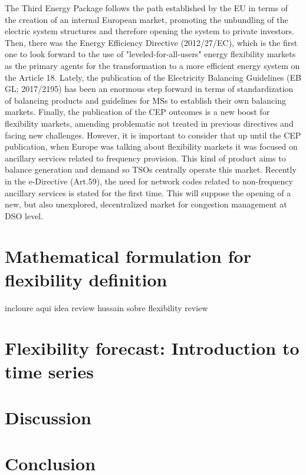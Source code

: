 The Third Energy Package follows the path established by the EU in terms of the creation of
an internal European market, promoting the unbundling of the electric system structures and therefore opening the system to private investors. Then, there was the Energy Efficiency Directive
(2012/27/EC), which is the first one to look forward to the use of "leveled-for-all-users"
energy flexibility markets as the primary agents for the transformation to a more efficient energy
system on the Article 18. Lately, the publication of the Electricity Balancing Guidelines (EB
GL; 2017/2195) has been an enormous step forward in terms of standardization of balancing
products and guidelines for MSs to establish their own balancing markets. Finally, the publication
of the CEP outcomes is a new boost for flexibility markets, amending problematic not
treated in previous directives and facing new challenges. 
However, it is important to consider that up until the CEP publication, when Europe was talking
about flexibility markets it was focused on ancillary services related to frequency provision.
This kind of product aims to balance generation and demand so TSOs centrally operate this market.
Recently in the e-Directive (Art.59), the need for network codes related to non-frequency
ancillary services is stated for the first time. This will suppose the opening of a new, but also
unexplored, decentralized market for congestion management at DSO level.

\section{Mathematical formulation for flexibility definition}
incloure aqui idea review hussain sobre flexibility review 


\section{Flexibility forecast: Introduction to time series}


\section{Discussion}
\section{Conclusion}

	


